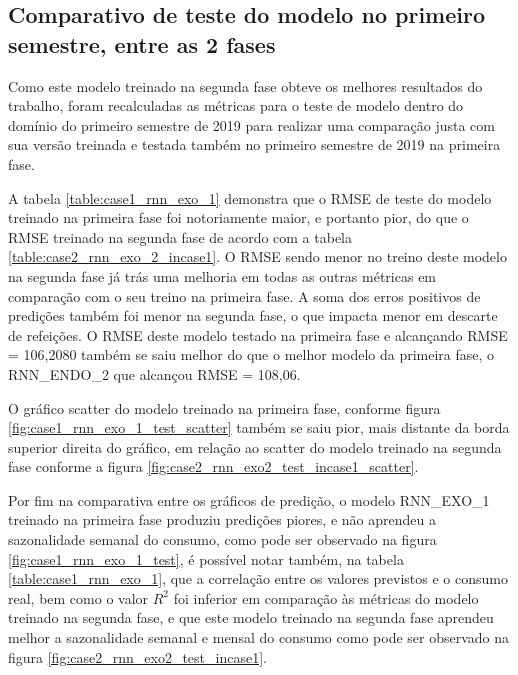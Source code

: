     \subsection{Comparativo de teste do modelo no primeiro semestre, entre as 2 fases}
        Como este modelo treinado na segunda fase obteve os melhores resultados do trabalho, foram recalculadas as métricas para o teste de modelo dentro do domínio do primeiro semestre de 2019 para realizar uma comparação justa com sua versão treinada e testada também no primeiro semestre de 2019 na primeira fase.
        
        A tabela \ref{table:case1_rnn_exo_1} demonstra que o RMSE de teste do modelo treinado na primeira fase foi notoriamente maior, e portanto pior, do que o RMSE treinado na segunda fase de acordo com a tabela \ref{table:case2_rnn_exo_2_incase1}. O RMSE sendo menor no treino deste modelo na segunda fase já trás uma melhoria em todas as outras métricas em comparação com o seu treino na primeira fase.
        A soma dos erros positivos de predições também foi menor na segunda fase, o que impacta menor em descarte de refeições.
        O RMSE deste modelo testado na primeira fase e alcançando RMSE = 106,2080 também se saiu melhor do que o melhor modelo da primeira fase, o RNN\_ENDO\_2 que alcançou RMSE = 108,06.
        
        O gráfico scatter do modelo treinado na primeira fase, conforme figura \ref{fig:case1_rnn_exo_1_test_scatter} também se saiu pior, mais distante da borda superior direita do gráfico, em relação ao scatter do modelo treinado na segunda fase conforme a figura \ref{fig:case2_rnn_exo2_test_incase1_scatter}.
        
        Por fim na comparativa entre os gráficos de predição, o modelo RNN\_EXO\_1 treinado na primeira fase produziu predições piores, e não aprendeu a sazonalidade semanal do consumo, como pode ser observado na figura \ref{fig:case1_rnn_exo_1_test}, é possível notar também, na tabela  \ref{table:case1_rnn_exo_1}, que a correlação entre os valores previstos e o consumo real, bem como o valor $R^2$ foi inferior em comparação às métricas do modelo treinado na segunda fase, e que este modelo treinado na segunda fase aprendeu melhor a sazonalidade semanal e mensal do consumo como pode ser observado na figura \ref{fig:case2_rnn_exo2_test_incase1}.
        
